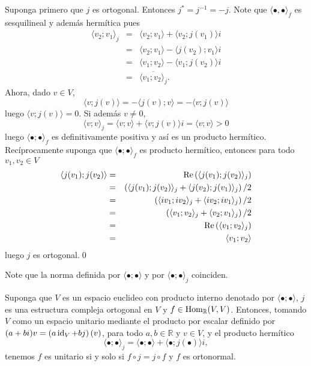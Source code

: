 \dem Suponga primero que $j$ es ortogonal. Entonces $j^*=j^{-1}=-j$. Note que $\langle\bullet,\bullet\rangle_f$ es sesquilineal y adem\'as herm\'itica pues
\begin{eqnarray*}
\langle v_2;v_1\rangle_j & = & \langle v_2;v_1\rangle+\langle v_2;j(v_1)\rangle i\\
 & = & \langle v_2;v_1\rangle-\langle j(v_2);v_1\rangle i\\
 & = & \langle v_1;v_2\rangle-\langle v_1;j(v_2)\rangle i\\
 & = & \overline{\langle v_1;v_2\rangle_j}.
\end{eqnarray*}
Ahora, dado $v\in V$, 
\[
\langle v;j(v)\rangle=-\langle j(v);v\rangle=-\langle v;j(v)\rangle
\]
luego $\langle v;j(v)\rangle=0$. Si adem\'as $v\ne 0$,
\[
\langle v;v \rangle_j=\langle v;v \rangle+\langle v;j(v) \rangle i= \langle v;v \rangle>0
\]
luego $\langle\bullet;\bullet\rangle_f$ es definitivamente positiva y as\'i es un producto herm\'itico.\\
Rec\'iprocamente suponga que $\langle\bullet;\bullet\rangle_f$ es producto herm\'itico, entonces para todo $v_1,v_2\in V$
\begin{eqnarray*}
\langle j(v_1);j(v_2)\rangle & = & \operatorname{Re}\left(\langle j(v_1);j(v_2)\rangle_j\right)\\
 & = & \left(\langle j(v_1);j(v_2)\rangle_j+\langle j(v_2);j(v_1)\rangle_j\right)/2\\
 & = & \left(\langle iv_1;iv_2\rangle_j+\langle iv_2;iv_1\rangle_j\right)/2\\
 & = & \left(\langle v_1;v_2\rangle_j+\langle v_2;v_1\rangle_j\right)/2\\
 & = & \operatorname{Re}\left(\langle v_1;v_2\rangle_j\right)\\
 & = & \langle v_1;v_2\rangle
\end{eqnarray*}
luego $j$ es ortogonal.\qed

\begin{obs}
Note que la norma definida por $\langle\bullet;\bullet\rangle$ y por $\langle\bullet;\bullet\rangle_j$ coinciden.
\end{obs}

\begin{pro}
Suponga que $V$ es un espacio euclideo con producto interno denotado por $\langle\bullet;\bullet\rangle$, $j$ es una estructura compleja ortogonal en $V$ y $f\in\operatorname{Hom}_\mathbb{R}(V,V)$. Entonces, tomando $V$ como un espacio unitario mediante el producto por escalar definido por $(a+bi)v=\left(a\operatorname{id}_V+bj\right)(v)$, para todo $a,b\in\mathbb{R}$ y $v\in V$, y el producto herm\'itico
\[
\langle\bullet;\bullet\rangle_j = \langle\bullet;\bullet\rangle+\langle\bullet;j(\bullet)\rangle i,
\]
tenemos $f$ es unitario si y solo si $f\circ j = j\circ f$ y $f$ es ortonormal.
\end{pro}

